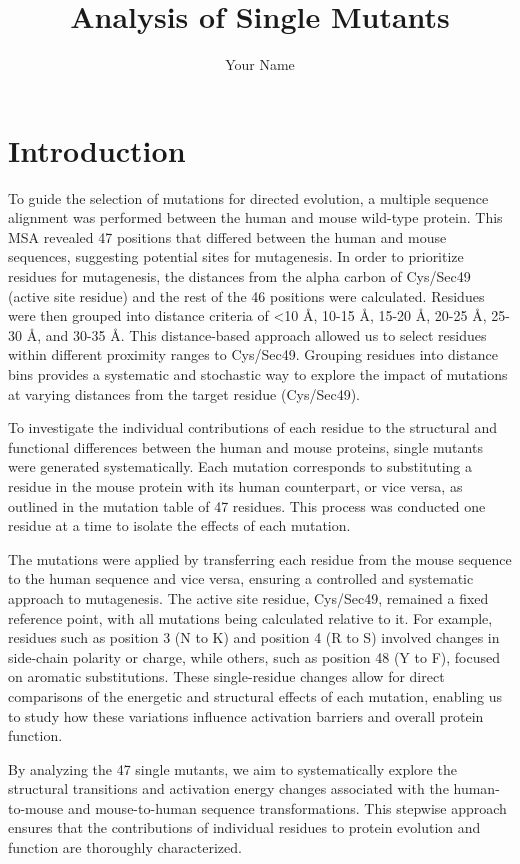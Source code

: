 \documentclass{article}
\title{Analysis of Single Mutants}
\author{Your Name} %
\date{}
\begin{document}
\maketitle

\section*{Introduction}
To guide the selection of mutations for directed evolution, a multiple sequence alignment was performed between the human and mouse wild-type protein. This MSA revealed 47 positions that differed between the human and mouse sequences, suggesting potential sites for mutagenesis. In order to prioritize residues for mutagenesis, the distances from the alpha carbon of Cys/Sec49 (active site residue) and the rest of the 46 positions were calculated. Residues were then grouped into distance criteria of <10 Å, 10-15 Å, 15-20 Å, 20-25 Å, 25-30 Å, and 30-35 Å. This distance-based approach allowed us to select residues within different proximity ranges to Cys/Sec49. Grouping residues into distance bins provides a systematic and stochastic way to explore the impact of mutations at varying distances from the target residue (Cys/Sec49). 

To investigate the individual contributions of each residue to the structural and functional differences between the human and mouse proteins, single mutants were generated systematically. Each mutation corresponds to substituting a residue in the mouse protein with its human counterpart, or vice versa, as outlined in the mutation table of 47 residues. This process was conducted one residue at a time to isolate the effects of each mutation.

The mutations were applied by transferring each residue from the mouse sequence to the human sequence and vice versa, ensuring a controlled and systematic approach to mutagenesis. The active site residue, Cys/Sec49, remained a fixed reference point, with all mutations being calculated relative to it. For example, residues such as position 3 (N to K) and position 4 (R to S) involved changes in side-chain polarity or charge, while others, such as position 48 (Y to F), focused on aromatic substitutions. These single-residue changes allow for direct comparisons of the energetic and structural effects of each mutation, enabling us to study how these variations influence activation barriers and overall protein function.

By analyzing the 47 single mutants, we aim to systematically explore the structural transitions and activation energy changes associated with the human-to-mouse and mouse-to-human sequence transformations. This stepwise approach ensures that the contributions of individual residues to protein evolution and function are thoroughly characterized.
\end{document}
